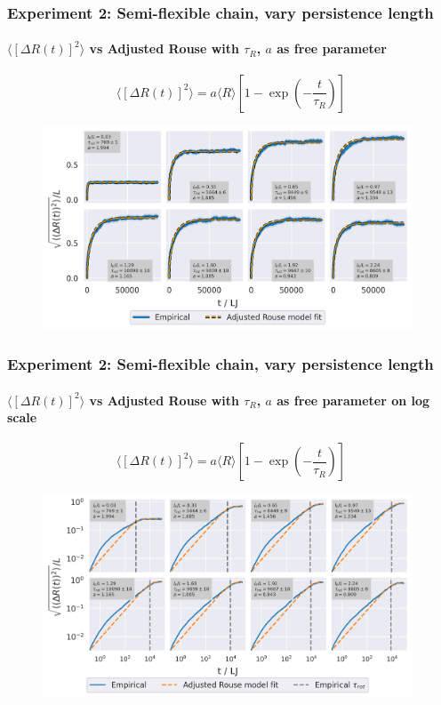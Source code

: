 \documentclass[handout]{beamer}
\newcommand{\mean}[1]{\langle #1 \rangle}
\begin{document}
\begin{frame}
    \frametitle{Experiment 2: Semi-flexible chain, vary persistence length}
    \framesubtitle{$\mean{[\Delta R(t)]^2}$ vs Adjusted Rouse with $\tau_R$, $a$ as free parameter}
    $$ \mean{[\Delta R(t)]^2} = a \mean{R} [1 - \exp(-\frac{t}{\tau_R})] $$
    \begin{figure}[h]
        \includegraphics[width=11cm]{./4-exp-delta_R-rouse_fit-tau-a.png}
    \end{figure}
\end{frame}

\begin{frame}
    \frametitle{Experiment 2: Semi-flexible chain, vary persistence length}
    \framesubtitle{$\mean{[\Delta R(t)]^2}$ vs Adjusted Rouse with $\tau_R$, $a$ as free parameter on log scale}
    $$ \mean{[\Delta R(t)]^2} = a \mean{R} [1 - \exp(-\frac{t}{\tau_R})] $$
    \begin{figure}[h]
        \includegraphics[width=11cm]{./4-exp-delta_R-rouse_fit-tau-a_log.png}
    \end{figure}
\end{frame}
\end{document}
